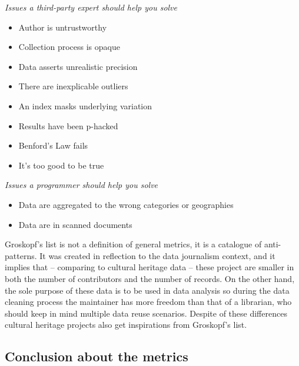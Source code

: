 \emph{Issues a third-party expert should help you solve}
\begin{itemize}
 \setlength{\parskip}{0pt}
 \setlength{\itemsep}{0pt plus 1pt}
 \item Author is untrustworthy
 \item Collection process is opaque
 \item Data asserts unrealistic precision
 \item There are inexplicable outliers
 \item An index masks underlying variation
 \item Results have been p-hacked
 \item Benford’s Law fails
 \item It’s too good to be true
\end{itemize}

\emph{Issues a programmer should help you solve}
\begin{itemize}
 \setlength{\parskip}{0pt}
 \setlength{\itemsep}{0pt plus 1pt}
 \item Data are aggregated to the wrong categories or geographies
 \item Data are in scanned documents
\end{itemize}

Groskopf's list is not a definition of general metrics, it is a catalogue of anti-patterns. It was created in reflection to the data journalism context, and it implies that -- comparing to cultural heritage data -- these  project are smaller in both the number of contributors and the number of records. On the other hand, the sole purpose of these data is to be used in data analysis so during the data cleaning process the maintainer has more freedom than that of a librarian, who should keep in mind multiple data reuse scenarios. Despite of these differences cultural heritage projects also get inspirations from Groskopf's list.

\subsection{Conclusion about the metrics}

